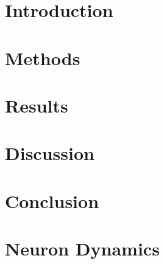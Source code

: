 \documentclass[prx,reprint,superscriptaddress]{revtex4-2}
\begin{document}




\date{\today}



\pacs{}

\maketitle

\section{Introduction}


\section{Methods}


\section{Results}


\section{Discussion}


\section{Conclusion}


\begin{acknowledgments}
 
\end{acknowledgments}

\appendix*
\section{Neuron Dynamics}



\end{document}
